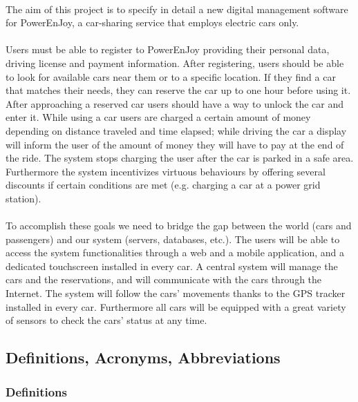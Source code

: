 \documentclass[english]{article}
\begin{document}
\paragraph{}
The aim of this project is to specify in detail a new digital management software for PowerEnJoy, a car-sharing service that employs electric cars only.

\paragraph{}
Users must be able to register to PowerEnJoy providing their personal data, driving license and payment information.
After registering, users should be able to look for available cars near them or to a specific location. If they find a car that matches their needs, they can reserve the car up to one hour before using it. After approaching a reserved car users should have a way to unlock the car and enter it.
While using a car users are charged a certain amount of money depending on distance traveled and time elapsed; while driving the car a display will inform the user of the amount of money they will have to pay at the end of the ride.
The system stops charging the user after the car is parked in a safe area.
Furthermore the system incentivizes virtuous behaviours by offering several discounts if certain conditions are met (e.g. charging a car at a power grid station).

\paragraph{}
To accomplish these goals we need to bridge the gap between the world (cars and passengers) and our system (servers, databases, etc.).
The users will be able to access the system functionalities through a web and a mobile application, and a dedicated touchscreen installed in every car.
A central system will manage the cars and the reservations, and will communicate with the cars through the Internet. The system will follow the cars’ movements thanks to the GPS tracker installed in every car. Furthermore all cars will be equipped with a great variety of sensors to check the cars’ status at any time.


\subsection{Definitions, Acronyms, Abbreviations}

\subsubsection{Definitions}
\end{document}
